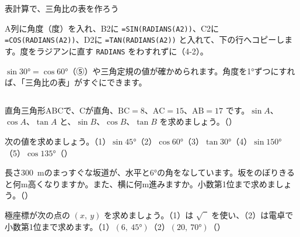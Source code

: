 \begin{column}{表計算で、三角比の表を作ろう}
\raggedright A列に角度（度）を入れ、B2に \texttt{=SIN(RADIANS(A2))}、C2に \texttt{=COS(RADIANS(A2))}、D2に \texttt{=TAN(RADIANS(A2))} と入れて、下の行へコピーします。度をラジアンに直す \texttt{RADIANS} をわすれずに（4-2）。\par\vspace{3pt}
\noindent\begin{minipage}[c]{0.6\linewidth}\centering
{}
\end{minipage}\hfill
\begin{minipage}[c]{0.37\linewidth}
$\sin\ang{30}=\cos\ang{60}$（⑤）や三角定規の値が確かめられます。角度を1°ずつにすれば、「三角比の表」がすぐにできます。
\end{minipage}
\end{column}

\bkendproblems
{}

\bkproblem 直角三角形ABCで、Cが直角、$\mathrm{BC}=8$、$\mathrm{AC}=15$、$\mathrm{AB}=17$ です。$\sin A$、$\cos A$、$\tan A$ と、$\sin B$、$\cos B$、$\tan B$ を求めましょう。\mbox{（）}

\bkproblem 次の値を求めましょう。\quad（1）$\sin\ang{45}$\quad（2）$\cos\ang{60}$\quad（3）$\tan\ang{30}$\quad（4）$\sin\ang{150}$\quad（5）$\cos\ang{135}$\mbox{（）}

\bkproblem 長さ\qty{300}{m}のまっすぐな坂道が、水平と\ang{6}の角をなしています。坂をのぼりきると何m高くなりますか。また、横に何m進みますか。小数第1位まで求めましょう。\mbox{（）}

\bkproblem 極座標が次の点の $(x,\ y)$ を求めましょう。（1）は $\sqrt{\phantom{2}}$ を使い、（2）は電卓で小数第1位まで求めます。\quad（1）$(6,\ \ang{45})$\quad（2）$(20,\ \ang{70})$\mbox{（）}

